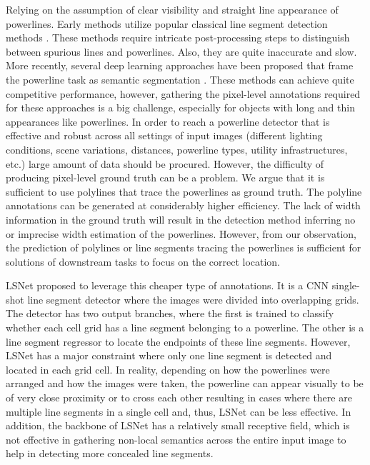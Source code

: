 \documentclass[journal]{IEEEtran}
\begin{document}
Relying on the assumption of clear visibility and straight line appearance of powerlines. Early methods utilize popular classical line segment detection methods \cite{related_work_kasturi_2002, related_work_guanjian_yan_2007, related_work_li_zhenrong_2010, related_work_candamo_2009, related_work_golightly_2005, related_work_zhengrong_li_2008, related_work_boris_alpatov_2016}. These methods require intricate post-processing steps to distinguish between spurious lines and powerlines. Also, they are quite inaccurate and slow. More recently, several deep learning approaches have been proposed that frame the powerline task as semantic segmentation \cite{related_work_rainesh_mandaan_2017,related_work_heng_zhang_2019,related_work_yan_li_2019,related_work_rabab_abdelfattah_2022,related_work_rabeea_haffari_2021}. These methods can achieve quite competitive performance, however, gathering the pixel-level annotations required for these approaches is a big challenge, especially for objects with long and thin appearances like powerlines. In order to reach a powerline detector that is effective and robust across all settings of input images (different lighting conditions, scene variations, distances, powerline types, utility infrastructures, etc.) large amount of data should be procured. However, the difficulty of producing pixel-level ground truth can be a problem. 
We argue that it is sufficient to use polylines that trace the powerlines as ground truth. The polyline annotations can be generated at considerably higher efficiency. The lack of width information in the ground truth will result in the detection method inferring no or imprecise width estimation of the powerlines. However, from our observation, the prediction of polylines or line segments tracing the powerlines is sufficient for solutions of downstream tasks to focus on the correct location.

LSNet \cite{Nguyen2020} proposed to leverage this cheaper type of annotations. It is a CNN single-shot line segment detector where the images were divided into overlapping grids. The detector has two output branches, where the first is trained to classify whether each cell grid has a line segment belonging to a powerline. The other is a line segment regressor to locate the endpoints of these line segments. However, LSNet has a major constraint where only one line segment is detected and located in each grid cell. In reality, depending on how the powerlines were arranged and how the images were taken, the powerline can appear visually to be of very close proximity or to cross each other resulting in cases where there are multiple line segments in a single cell and, thus, LSNet can be less effective. In addition, the backbone of LSNet has a relatively small receptive field, which is not effective in gathering non-local semantics across the entire input image to help in detecting more concealed line segments.
\end{document}
